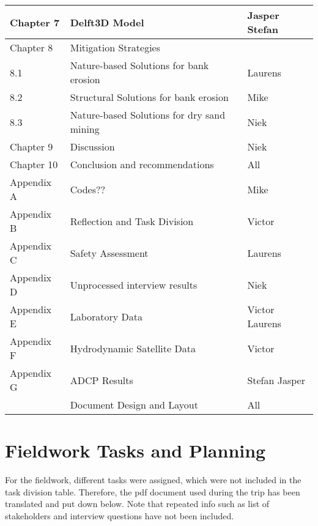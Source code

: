 \begin{table}[htb]
    \setlength\extrarowheight{4pt}
    \centering
    \caption*{}
    \label{tab:taskdivision2}
    \begin{tabularx}{\textwidth}{lXX}
        \toprule
                Chapter 7 & Delft3D Model & Jasper Stefan\\
        \midrule
        Chapter 8 & Mitigation Strategies & \\
        8.1 & Nature-based Solutions for bank erosion & Laurens \\
        8.2 & Structural Solutions for bank erosion & Mike \\
        8.3 & Nature-based Solutions for dry sand mining & Niek \\
        \midrule
        Chapter 9 & Discussion & Niek \\
        \midrule
        Chapter 10 & Conclusion and recommendations & All \\
        \midrule
        Appendix A & Codes?? & Mike \\
        Appendix B & Reflection and Task Division & Victor \\
        Appendix C & Safety Assessment & Laurens \\
        Appendix D & Unprocessed interview results & Niek \\
        Appendix E & Laboratory Data & Victor Laurens \\
        Appendix F & Hydrodynamic Satellite Data & Victor \\
        Appendix G & ADCP Results & Stefan Jasper\\
        \midrule
        & Document Design and Layout & All \\
        \bottomrule
    \end{tabularx}
\end{table}

\section{Fieldwork Tasks and Planning}

For the fieldwork, different tasks were assigned, which were not included in the task division table. 
Therefore, the pdf document used during the trip has been translated and put down below.
Note that repeated info such as list of stakeholders and interview questions have not been included.

